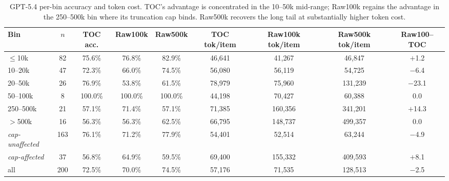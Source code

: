 \documentclass{article}
\begin{document}
\begin{table}[h]
\centering
\scriptsize
\setlength{\tabcolsep}{4pt}
\caption{GPT-5.4 per-bin accuracy and token cost. TOC's advantage is concentrated in the 10--50k mid-range; Raw100k regains the advantage in the 250--500k bin where its truncation cap binds. Raw500k recovers the long tail at substantially higher token cost.}
\label{tab:appendix-bin-gpt54}
\begin{tabular}{lcccccccc}
\toprule
Bin & $n$ & TOC acc. & Raw100k & Raw500k & TOC tok/item & Raw100k tok/item & Raw500k tok/item & Raw100--TOC \\
\midrule
$\le$10k & 82 & 75.6\% & 76.8\% & 82.9\% & 46{,}641 & 41{,}267 & 46{,}847 & $+$1.2 \\
10--20k & 47 & 72.3\% & 66.0\% & 74.5\% & 56{,}080 & 56{,}119 & 54{,}725 & $-$6.4 \\
20--50k & 26 & 76.9\% & 53.8\% & 61.5\% & 78{,}979 & 75{,}960 & 131{,}239 & $-$23.1 \\
50--100k & 8 & 100.0\% & 100.0\% & 100.0\% & 44{,}198 & 70{,}427 & 60{,}388 & 0.0 \\
250--500k & 21 & 57.1\% & 71.4\% & 57.1\% & 71{,}385 & 160{,}356 & 341{,}201 & $+$14.3 \\
$>$500k & 16 & 56.3\% & 56.3\% & 62.5\% & 66{,}795 & 148{,}737 & 499{,}357 & 0.0 \\
\midrule
\textit{cap-unaffected} & 163 & 76.1\% & 71.2\% & 77.9\% & 54{,}401 & 52{,}514 & 63{,}244 & $-$4.9 \\
\textit{cap-affected} & 37 & 56.8\% & 64.9\% & 59.5\% & 69{,}400 & 155{,}332 & 409{,}593 & $+$8.1 \\
all & 200 & 72.5\% & 70.0\% & 74.5\% & 57{,}176 & 71{,}535 & 128{,}513 & $-$2.5 \\
\bottomrule
\end{tabular}
\end{table}
\end{document}

